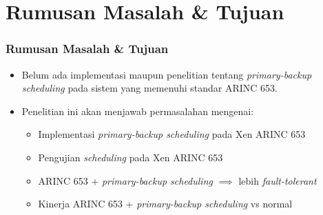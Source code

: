 \documentclass[xetex]{beamer}
\begin{document}
    \section{Rumusan Masalah \& Tujuan}
    \begin{frame}
        \frametitle{Rumusan Masalah \& Tujuan}
        \begin{itemize}
            \item Belum ada implementasi maupun penelitian tentang \textit{primary-backup scheduling} pada sistem yang memenuhi standar ARINC 653.
            \item Penelitian ini akan menjawab permasalahan mengenai:
                \begin{itemize}
                    \item Implementasi \textit{primary-backup scheduling} pada Xen ARINC 653
                    \item Pengujian \textit{scheduling} pada Xen ARINC 653
                    \item ARINC 653 + \textit{primary-backup scheduling} $\implies$ lebih \textit{fault-tolerant}
                    \item Kinerja ARINC 653 + \textit{primary-backup scheduling} vs normal
                \end{itemize}
        \end{itemize}
    \end{frame}
\end{document}
